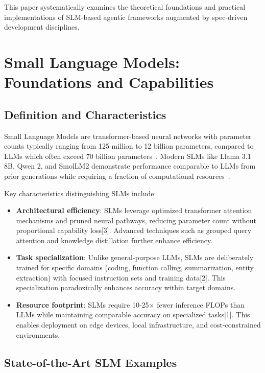\documentclass[11pt,a4paper]{article}
\begin{document}
This paper systematically examines the theoretical foundations and practical implementations of SLM-based agentic frameworks augmented by spec-driven development disciplines.

\section{Small Language Models: Foundations and Capabilities}

\subsection{Definition and Characteristics}
Small Language Models are transformer-based neural networks with parameter counts typically ranging from 125 million to 12 billion parameters, compared to LLMs which often exceed 70 billion parameters~\cite{nvidia2025}. Modern SLMs like Llama 3.1 8B, Qwen 2, and SmolLM2 demonstrate performance comparable to LLMs from prior generations while requiring a fraction of computational resources~\cite{belcak2025,thirdeye2025}.

Key characteristics distinguishing SLMs include:
\begin{itemize}
    \item \textbf{Architectural efficiency}: SLMs leverage optimized transformer attention mechanisms and pruned neural pathways, reducing parameter count without proportional capability loss[3]. Advanced techniques such as grouped query attention and knowledge distillation further enhance efficiency.
    \item \textbf{Task specialization}: Unlike general-purpose LLMs, SLMs are deliberately trained for specific domains (coding, function calling, summarization, entity extraction) with focused instruction sets and training data[2]. This specialization paradoxically enhances accuracy within target domains.
    \item \textbf{Resource footprint}: SLMs require 10-25$\times$ fewer inference FLOPs than LLMs while maintaining comparable accuracy on specialized tasks[1]. This enables deployment on edge devices, local infrastructure, and cost-constrained environments.
\end{itemize}

\subsection{State-of-the-Art SLM Examples}
\end{document}
